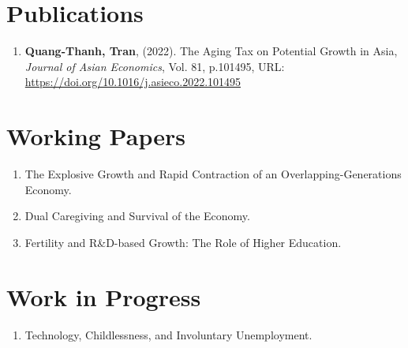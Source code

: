 \section{\sc Publications}
\begin{enumerate}
\item
  {\bf Quang-Thanh, Tran},
  (2022).
  {The Aging Tax on Potential Growth in Asia},
  {\it Journal of Asian Economics}, Vol. 81, p.101495,
  {URL: \url{https://doi.org/10.1016/j.asieco.2022.101495}}
\end{enumerate}

\section{\sc Working Papers}
\begin{enumerate}
  \item The Explosive Growth and Rapid Contraction of an Overlapping-Generations Economy. 
  \item Dual Caregiving and Survival of the Economy.
  \item Fertility and R&D-based Growth: The Role of Higher Education.
\end{enumerate}

\section{\sc Work in Progress}
\begin{enumerate}
  \item Technology, Childlessness, and Involuntary Unemployment.
\end{enumerate}


